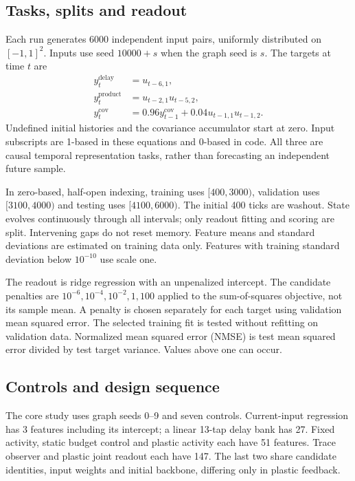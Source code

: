 \documentclass[11pt,a4paper]{article}
\theoremstyle{definition}\newtheorem{definition}[theorem]{Definition}
\begin{document}
\subsection{Tasks, splits and readout}
Each run generates 6000 independent input pairs, uniformly distributed on $[-1,1]^2$. Inputs use seed $10000+s$ when the graph seed is $s$. The targets at time $t$ are
\begin{align}
 y_t^{\mathrm{delay}}&=u_{t-6,1},\\
 y_t^{\mathrm{product}}&=u_{t-2,1}u_{t-5,2},\\
 y_t^{\mathrm{cov}}&=0.96y_{t-1}^{\mathrm{cov}}+0.04u_{t-1,1}u_{t-1,2}. \label{eq:targets}
\end{align}
Undefined initial histories and the covariance accumulator start at zero. Input subscripts are 1-based in these equations and 0-based in code. All three are causal temporal representation tasks, rather than forecasting an independent future sample.

In zero-based, half-open indexing, training uses $[400,3000)$, validation uses $[3100,4000)$ and testing uses $[4100,6000)$. The initial 400 ticks are washout. State evolves continuously through all intervals; only readout fitting and scoring are split. Intervening gaps do not reset memory. Feature means and standard deviations are estimated on training data only. Features with training standard deviation below $10^{-10}$ use scale one.

The readout is ridge regression with an unpenalized intercept. The candidate penalties are $10^{-6},10^{-4},10^{-2},1,100$ applied to the sum-of-squares objective, not its sample mean. A penalty is chosen separately for each target using validation mean squared error. The selected training fit is tested without refitting on validation data. Normalized mean squared error (NMSE) is test mean squared error divided by test target variance. Values above one can occur.

\subsection{Controls and design sequence}
The core study uses graph seeds 0--9 and seven controls. Current-input regression has 3 features including its intercept; a linear 13-tap delay bank has 27. Fixed activity, static budget control and plastic activity each have 51 features. Trace observer and plastic joint readout each have 147. The last two share candidate identities, input weights and initial backbone, differing only in plastic feedback.
\end{document}
